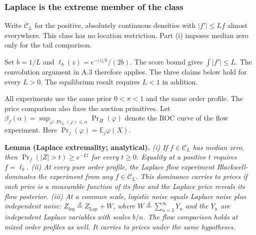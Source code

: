 
\subsubsection{Laplace is the extreme member of the class}\label{oa-a-laplace-extreme}

Write \(\mathcal C_L\) for the positive, absolutely continuous densities
with \(|f'|\le Lf\) almost everywhere.
This class has no location restriction.
Part (i) imposes median zero only for the tail comparison.
\par
Set \(b=1/L\) and \(\ell_b(z)=e^{-|z|/b}/(2b)\).
The score bound gives \(\int|f'|\le L\).
The convolution argument in A.3 therefore applies.
The three claims below hold for every \(L>0\).
The equilibrium result requires \(L<1\) in addition.
\par
All experiments use the same prior \(0<\pi<1\) and the same order profile.
The price comparison also fixes the auction primitives.
Let \(\beta_f(\alpha)=\sup_{\varphi:\Pr_L(\varphi)\le\alpha}\Pr_H(\varphi)\)
denote the ROC curve of the flow experiment.
Here \(\Pr_j(\varphi)=\mathbb E_j\varphi(X)\).


\protect{}\label{result-lemma-oa-laplace-extreme}{\textbf{Lemma
(Laplace extremality; analytical).}} \emph{(i) If \(f\in\mathcal C_L\)
has median zero, then \(\Pr_f(|Z|>t)\ge e^{-Lt}\) for every \(t\ge0\).
Equality at a positive \(t\) requires \(f=\ell_b\).
(ii) At every pure order profile, the Laplace flow experiment Blackwell-dominates the experiment from any \(f\in\mathcal C_L\).
This dominance carries to prices if each price is a measurable function of its flow and the Laplace price reveals its flow posterior.
(iii) At a common scale, logistic noise equals Laplace noise plus independent noise:
\(Z_{\mathrm{log}}\overset d=Z_{\mathrm{Lap}}+W\), where
\(W\overset d=\sum_{n=2}^{\infty}Y_n\) and the \(Y_n\) are independent Laplace variables with scales \(b/n\).
The flow comparison holds at mixed order profiles as well.
It carries to prices under the same hypotheses.}

